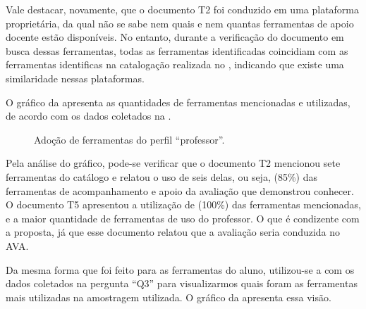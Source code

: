 Vale destacar, novamente, que o documento T2 foi conduzido em uma plataforma proprietária, da qual não se sabe nem quais e nem quantas ferramentas de apoio docente estão disponíveis. No entanto, durante a verificação do documento em busca dessas ferramentas, todas as ferramentas identificadas coincidiam com as ferramentas identificas na catalogação realizada no , indicando que existe uma similaridade nessas plataformas.

O gráfico da  apresenta as quantidades de ferramentas mencionadas e utilizadas, de acordo com os dados coletados na  .

\begin{figure}[ht!]
    \centering
    \label{fig:ferram_profe}
    \caption{Adoção de ferramentas do perfil ``professor''.}
    \vspace{2mm}
    \vspace{2mm}
\end{figure}

Pela análise do gráfico, pode-se verificar que o documento T2 mencionou sete ferramentas do catálogo e relatou o uso de seis delas, ou seja, (85\%) das ferramentas de acompanhamento e apoio da avaliação que demonstrou conhecer. O documento T5 apresentou a utilização de (100\%) das ferramentas mencionadas, e a maior quantidade de ferramentas de uso do professor. O que é condizente com a proposta, já que esse documento relatou que a avaliação seria conduzida no AVA.

Da mesma forma que foi feito para as ferramentas do aluno, utilizou-se a  com os dados coletados na pergunta ``Q3'' para visualizarmos quais foram as ferramentas mais utilizadas na amostragem utilizada. O gráfico da  apresenta essa visão. 

